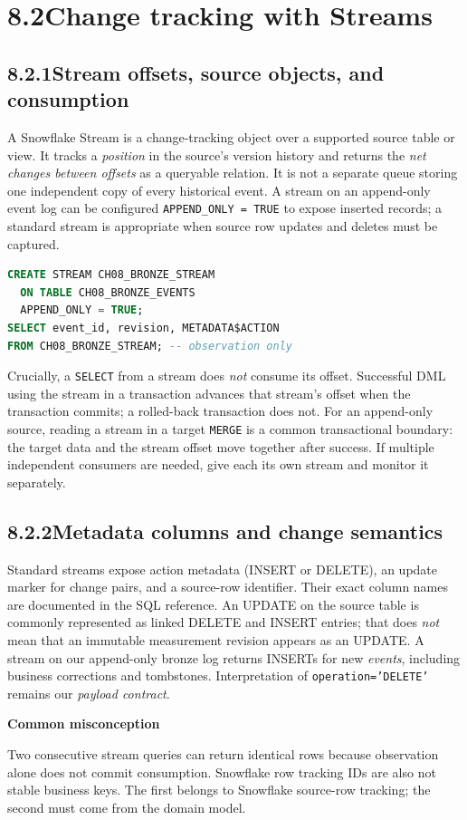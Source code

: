 \documentclass[11pt,twoside]{article}
\newcommand{\topic}[2]{\subsection*{#1\quad #2}}
\begin{document}
\section*{8.2\quad Change tracking with Streams}
\topic{8.2.1}{Stream offsets, source objects, and consumption}
A Snowflake Stream is a change-tracking object over a supported source table or view. It tracks a \emph{position} in the source's version history and returns the \emph{net changes between offsets} as a queryable relation. It is not a separate queue storing one independent copy of every historical event. A stream on an append-only event log can be configured \texttt{APPEND\_ONLY = TRUE} to expose inserted records; a standard stream is appropriate when source row updates and deletes must be captured.
\begin{lstlisting}[language=SQL,caption={Create an insert-only change boundary for an append-only source.}]
CREATE STREAM CH08_BRONZE_STREAM
  ON TABLE CH08_BRONZE_EVENTS
  APPEND_ONLY = TRUE;
SELECT event_id, revision, METADATA$ACTION
FROM CH08_BRONZE_STREAM; -- observation only
\end{lstlisting}
Crucially, a \texttt{SELECT} from a stream does \emph{not} consume its offset. Successful DML using the stream in a transaction advances that stream's offset when the transaction commits; a rolled-back transaction does not. For an append-only source, reading a stream in a target \texttt{MERGE} is a common transactional boundary: the target data and the stream offset move together after success. If multiple independent consumers are needed, give each its own stream and monitor it separately.
\topic{8.2.2}{Metadata columns and change semantics}
Standard streams expose action metadata (INSERT or DELETE), an update marker for change pairs, and a source-row identifier. Their exact column names are documented in the SQL reference. An UPDATE on the source table is commonly represented as linked DELETE and INSERT entries; that does \emph{not} mean that an immutable measurement revision appears as an UPDATE. A stream on our append-only bronze log returns INSERTs for new \emph{events}, including business corrections and tombstones. Interpretation of \texttt{operation='DELETE'} remains our \emph{payload contract}.
\begin{whitebox}\textbf{Common misconception}\par
Two consecutive stream queries can return identical rows because observation alone does not commit consumption. Snowflake row tracking IDs are also not stable business keys. The first belongs to Snowflake source-row tracking; the second must come from the domain model.\end{whitebox}
\end{document}
